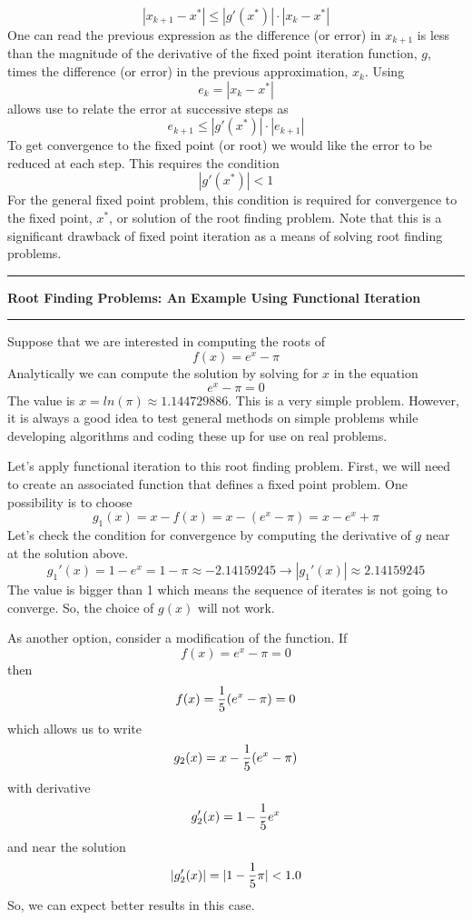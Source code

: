 \documentclass[10pt,fleqn]{article}
\begin{document}
$$
  | x_{k+1} - x^* | \leq | g'(x^*) | \cdot | x_k - x^* |
$$
One can read the previous expression as the difference (or error) in $x_{k+1}$
is less than the magnitude of the derivative of the fixed point iteration 
function, $g$, times the difference (or error) in the previous approximation,
$x_k$. Using
$$
  e_{k} = | x_k - x^* |
$$
allows use to relate the error at successive steps as
$$
  e_{k+1} \leq | g'(x^*) | \cdot | e_{k+1} |
$$
To get convergence to the fixed point (or root) we would like the error to be
reduced at each step. This requires the condition
$$
  | g'(x^*) | < 1
$$
For the general fixed point problem, this condition is required for convergence
to the fixed point, $x^*$, or solution of the root finding problem. Note that
this is a significant drawback of fixed point iteration as a means of solving
root finding problems.
\vskip0.1in\hrule\vskip0.1in
\noindent
{\bf Root Finding Problems: An Example Using Functional Iteration} 
\vskip0.1in\hrule\vskip0.1in
\noindent
Suppose that we are interested in computing the roots of
$$
  f(x) = e^x - \pi
$$
Analytically we can compute the solution by solving for $x$ in the equation
$$
  e^x - \pi = 0
$$
The value is $x=ln(\pi)\approx 1.144729886$. This is a very simple problem.
However, it is always a good idea to test general methods on simple problems
while developing algorithms and coding these up for use on real problems.

Let's apply functional iteration to this root finding problem. First, we will
need to create an associated function that defines a fixed point problem. One
possibility is to choose
$$
  g_1(x) = x - f(x) = x - ( e^x - \pi ) = x - e^x + \pi
$$
Let's check the condition for convergence by computing the derivative of $g$
near at the solution above.
$$
  g_1'(x) = 1 - e^x = 1 - \pi \approx -2.14159245 \rightarrow 
  | g_1'(x) | \approx 2.14159245
$$
The value is bigger than 1 which means the sequence of iterates is not going to
converge. So, the choice of $g(x)$ will not work.

As another option, consider a modification of the function. If
$$
  f(x) = e^x - \pi = 0
$$
then
$$
  f(x) = {1\over 5} ( e^x - \pi ) = 0
$$
which allows us to write
$$
  g_2(x) = x - {1\over 5} ( e^x - \pi )
$$
with derivative
$$
  g_2'(x) = 1 - {1\over 5} e^x 
$$
and near the solution
$$
  |g_2'(x)| = | 1 - {1\over 5} \pi | < 1.0
$$
So, we can expect better results in this case.
\end{document}
